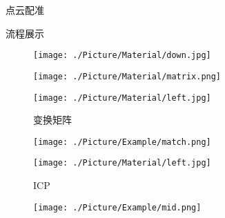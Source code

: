 \documentclass[xcolor=table,notheorems,compress,blue]{beamer}
\begin{document}
\begin{frame}{点云配准}
\begin{exampleblock}{流程展示}
\begin{figure}[htpb]
\begin{minipage}[b]{0.8in}
				\end{minipage}
				\begin{minipage}[b]{0.6in}
					\centerline{ \texttt{[image: ./Picture/Material/down.jpg]} }
				\end{minipage}
			\end{figure}
			\vspace{-50pt} 
			\hspace{-65pt}
			\vspace{15pt} 
			\begin{figure}[htpb]
				\centering
				\begin{minipage}[b]{0.8in}
					\centerline{ \texttt{[image: ./Picture/Material/matrix.png]} }
				\end{minipage}
				\begin{minipage}[b]{0.8in}
					\centerline{ \quad}
					\centerline{ \texttt{[image: ./Picture/Material/left.jpg]} }
					\centerline{\tiny{变换矩阵}}
				\end{minipage}
				\begin{minipage}[b]{0.8in}
					\centerline{ \texttt{[image: ./Picture/Example/match.png]} }
				\end{minipage}
				\begin{minipage}[b]{0.8in}
					\centerline{ \texttt{[image: ./Picture/Material/left.jpg]} }
					\centerline{\tiny{ICP}}
				\end{minipage}
				\begin{minipage}[b]{0.8in}
					\centerline{ \texttt{[image: ./Picture/Example/mid.png]} }
				\end{minipage}
			\end{figure}
		\end{exampleblock}
	\end{frame}
\end{document}
